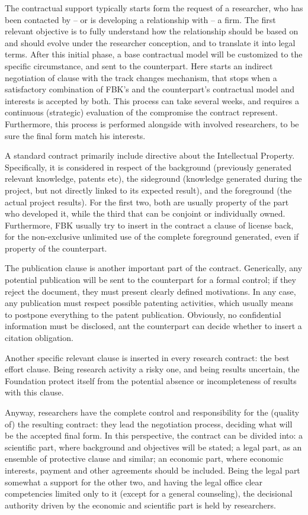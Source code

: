 The contractual support typically starts form the request of a researcher, who has been contacted by – or is developing a relationship with – a firm. The first relevant objective is to fully understand how the relationship should be based on and should evolve under the researcher conception, and to translate it into legal terms. After this initial phase, a base contractual model will be customized to the specific circumstance, and sent to the counterpart. Here starts an indirect negotiation of clause with the track changes mechanism, that stops when a satisfactory combination of FBK’s and the counterpart’s contractual model and interests is accepted by both. This process can take several weeks, and requires a continuous (strategic) evaluation of the compromise the contract represent. Furthermore, this process is performed alongside with involved researchers, to be sure the final form match his interests.

A standard contract primarily include directive about the Intellectual Property. Specifically, it is considered in respect of the background (previously generated relevant knowledge, patents etc), the sideground (knowledge generated during the project, but not directly linked to its expected result), and the foreground (the actual project results). For the first two, both are usually property of the part who developed it, while the third that can be conjoint or individually owned. Furthermore, FBK usually try to insert in the contract a clause of license back, for the non-exclusive unlimited use of the complete foreground generated, even if property of the counterpart.

The publication clause is another important part of the contract. Generically, any potential publication will be sent to the counterpart for a formal control; if they reject the document, they must present clearly defined motivations. In any case, any publication must respect possible patenting activities, which usually means to postpone everything to the patent publication. Obviously, no confidential information must be disclosed, ant the counterpart can decide whether to insert a citation obligation. 

Another specific relevant clause is inserted in every research contract: the best effort clause. Being research activity a risky one, and being results uncertain, the Foundation protect itself from the potential absence or incompleteness of results with this clause.  

Anyway, researchers have the complete control and responsibility for the (quality of) the resulting contract: they lead the negotiation process, deciding what will be the accepted final form. In this perspective, the contract can be divided into: a scientific part, where background and objectives will be stated; a legal part, as an ensemble of protective clause and similar; an economic part, where economic interests, payment and other agreements should be included. Being the legal part somewhat a support for the other two, and having the legal office clear competencies limited only to it (except for a general counseling), the decisional authority driven by the economic and scientific part is held by researchers.

